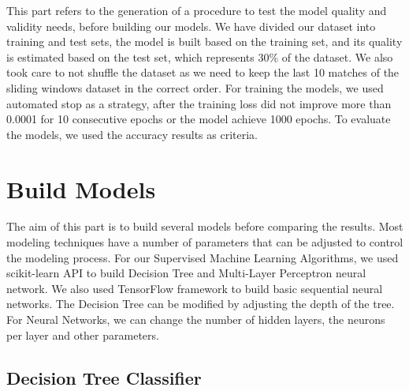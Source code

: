 This part refers to the generation of a procedure to test the model quality and validity needs, before building our models. \newline \newline
We have divided our dataset into training and test sets, the model is built based on the training set, and its quality is estimated based on the test set, which represents 30\% of the dataset. \newline
We also took care to not shuffle the dataset as we need to keep the last 10 matches of the sliding windows dataset in the correct order. \newline \newline
For training the models, we used automated stop as a strategy, after the training loss did not improve more than 0.0001 for 10 consecutive epochs or the model achieve 1000 epochs.\newline \newline
To evaluate the models, we used the accuracy results as criteria.


\section{Build Models}

The aim of this part is to build several models before comparing the results.\newline
Most modeling techniques have a number of parameters that can be adjusted to control the modeling process.\newline \newline
For our Supervised Machine Learning Algorithms, we used scikit-learn API to build Decision Tree and Multi-Layer Perceptron neural network. We also used TensorFlow framework to build basic sequential neural networks.\newline \newline
The Decision Tree can be modified by adjusting the depth of the tree. For Neural Networks, we can change the number of hidden layers, the neurons per layer and other parameters.


\subsection{Decision Tree Classifier}

